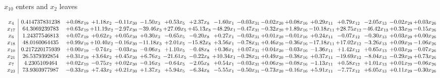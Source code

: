 \documentclass[9pt]{article}
\begin{document}
 $ x_{10} $ enters and $ x_{2} $ leaves 

 \[\begin{array}{c| c c@{\hskip 2pt} c@{\hskip 2pt} c@{\hskip 2pt} c@{\hskip 2pt} c@{\hskip 2pt} c@{\hskip 2pt} c@{\hskip 2pt} c@{\hskip 2pt} c@{\hskip 2pt} c@{\hskip 2pt} c@{\hskip 2pt} c@{\hskip 2pt} c@{\hskip 2pt} c@{\hskip 2pt} c@{\hskip 2pt} }
 x_{4}   &  0.414737831238 & +  0.08 x_{19} & +  1.18 x_{2} & -0.11 x_{30} & -1.50 x_{3} & +  0.53 x_{5} & +  2.37 x_{8} & -1.60 x_{1} & -0.03 x_{31} & -0.02 x_{20} & +  0.08 x_{16} & +  0.29 x_{11} & +  0.79 x_{12} & -2.05 x_{13} & -0.02 x_{29} & +  0.03 x_{26}\\
 x_{17}   &  64.3069239783 & +  0.63 x_{19} & + 11.19 x_{2} & -2.97 x_{30} & -39.46 x_{3} & + 27.09 x_{5} & + 45.13 x_{8} & -48.29 x_{1} & -0.47 x_{31} & -0.32 x_{20} & +  1.89 x_{16} & -10.18 x_{11} & + 28.75 x_{12} & -46.42 x_{13} & +  0.33 x_{29} & -0.15 x_{26}\\
 x_{6}   &  1.24377546813 & +  0.07 x_{19} & +  0.62 x_{2} & +  0.05 x_{30} & +  0.30 x_{3} & -0.65 x_{5} & -0.20 x_{8} & +  0.27 x_{1} & -0.03 x_{31} & +  0.01 x_{20} & -0.01 x_{16} & +  0.24 x_{11} & -0.07 x_{12} & -0.30 x_{13} & +  0.03 x_{29} & +  0.00 x_{26}\\
 x_{18}   &  48.0160064435 & +  0.99 x_{19} & + 10.40 x_{2} & -0.16 x_{30} & -11.18 x_{3} & +  2.01 x_{5} & -15.82 x_{8} & +  3.56 x_{1} & -0.78 x_{31} & +  0.46 x_{20} & -0.36 x_{16} & -17.18 x_{11} & + 17.02 x_{12} & -3.26 x_{13} & +  0.09 x_{29} & -1.06 x_{26}\\
 x_{10}   &  0.217220175939 & +  0.00 x_{19} & -0.74 x_{2} & -0.03 x_{30} & -0.06 x_{3} & +  1.10 x_{5} & -0.48 x_{8} & +  0.36 x_{1} & +  0.07 x_{31} & +  0.04 x_{20} & -0.03 x_{16} & -1.36 x_{11} & +  1.42 x_{12} & +  0.65 x_{13} & +  0.03 x_{29} & -0.07 x_{26}\\
 x_{21}   &  26.5379392854 & +  0.31 x_{19} & +  3.64 x_{2} & +  0.45 x_{30} & +  6.76 x_{3} & -21.61 x_{5} & -0.22 x_{8} & + 10.34 x_{1} & -0.28 x_{31} & +  0.49 x_{20} & -0.38 x_{16} & +  0.37 x_{11} & -19.69 x_{12} & -8.04 x_{13} & -0.29 x_{29} & +  0.73 x_{26}\\
 x_{7}   &  4.2305109464 & +  0.02 x_{19} & -0.75 x_{2} & +  0.02 x_{30} & -0.16 x_{3} & -0.64 x_{5} & -2.05 x_{8} & +  0.54 x_{1} & -0.03 x_{31} & +  0.06 x_{20} & -0.08 x_{16} & -1.13 x_{11} & +  0.58 x_{12} & +  1.01 x_{13} & +  0.01 x_{29} & -0.06 x_{26}\\
 x_{23}   &  73.9303977987 & -0.33 x_{19} & +  7.43 x_{2} & +  0.21 x_{30} & +  1.37 x_{3} & +  5.94 x_{5} & -6.34 x_{8} & -5.55 x_{1} & -0.50 x_{31} & -0.73 x_{20} & -0.16 x_{16} & +  5.91 x_{11} & -7.77 x_{12} & +  6.05 x_{13} & +  0.11 x_{29} & -0.30 x_{26}\\

\end{array}\]
\end{document}
